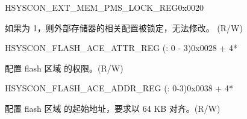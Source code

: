 















\begin{register}{H}{SYSCON\_EXT\_MEM\_PMS\_LOCK\_REG}{0x{}0020}\label{regdescSYSCONEXTMEMPMSLOCKREG}
%
%
\regnewline%
\begin{regdesc}\begin{reglist}
\label{fielddescSYSCONEXTMEMPMSLOCK}\item [SYSCON\_EXT\_MEM\_PMS\_LOCK] 如果为 1，则外部存储器的相关配置被锁定，无法修改。 (R/W)
\end{reglist}\end{regdesc}
\end{register}




\begin{register}{H}{SYSCON\_FLASH\_ACE\_ATTR\_REG (: 0 - 3)}{0x{}0028 + 4*}\label{regdescSYSCONFLASHACEnATTRREG}
%
%
\regnewline%
\begin{regdesc}\begin{reglist}
\label{fielddescSYSCONFLASHACEnATTR}\item [SYSCON\_FLASH\_ACE\regindex{n}\_ATTR] 配置 flash 区域 的权限。(R/W)
\end{reglist}\end{regdesc}
\end{register}

\begin{register}{H}{SYSCON\_FLASH\_ACE\_ADDR\_REG (: 0-3)}{0x{}0038 + 4*}\label{regdescSYSCONFLASHACEnADDRREG}
%
\regnewline%
\begin{regdesc}\begin{reglist}
\label{fielddescSYSCONFLASHACEnADDRS}\item [SYSCON\_FLASH\_ACE0\_ADDR\_S] 配置 flash 区域 的起始地址，要求以 64 KB 对齐。(R/W)
\end{reglist}\end{regdesc}
\end{register}


